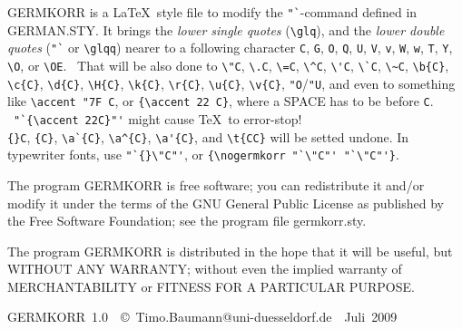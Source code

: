 \documentclass[12pt,a4paper]{article} \usepackage{german,germkorr}
\begin{document}
\vspace{0.7cm}\noindent\originalTeX GERMKORR is a \LaTeX\ style file to
modify the \verb|"`|-command defined in GERMAN.STY\@. It brings the {\it
lower single quotes\/} (\verb|\glq|), and the {\it lower double quotes\/}
(\verb|"`| or \verb|\glqq|) nearer to a following character \verb|C|,
\verb|G|, \verb|O|, \verb|Q|, \verb|U|, \verb|V|, \verb|v|, \verb|W|,
\verb|w|, \verb|T|, \verb|Y|, \verb|\O|, or \verb|\OE|. \ That will be also
done to \verb|\"C|, \verb|\.C|, \verb|\=C|, \verb|\^C|, \verb|\'C|,
\verb|\`C|, \verb|\~C|, \verb|\b{C}|, \verb|\c{C}|, \verb|\d{C}|,
\verb|\H{C}|, \verb|\k{C}|, \verb|\r{C}|, \verb|\u{C}|, \verb|\v{C}|,
\verb|"O|/\verb|"U|, and even to something like
\verb|\accent|~\verb|"7F|~\verb|C|, or \verb|{\accent|~\verb|22|~\verb|C}|,
where a SPACE has to be before \verb|C|. \ \verb|"`{\accent|~\verb|22C}"'|
might cause \TeX\ to error-stop!
\\ \verb|{}C|, \verb|{C}|, \verb|\a`{C}|, \verb|\a^{C}|, \verb|\a'{C}|, and
\verb|\t{CC}| will be setted undone. In typewriter fonts, use
\verb|"`{}\"C"'|, or \verb|{\nogermkorr|~\verb|"`\"C"'|~\verb|"`\"C"'}|.


\vfill {\footnotesize The program GERMKORR is free software; you can
redistribute it and/or modify it under the terms of the GNU General Public
License as published by the Free Software Foundation; see the program file
germkorr.sty.

The program GERMKORR is distributed in the hope that it will be useful, but 
WITHOUT ANY WARRANTY; without even the implied warranty of MERCHANTABILITY
or FITNESS FOR A PARTICULAR PURPOSE.}

\vfill \hfill 
\hbox{GERMKORR~1.0~~\copyright~Timo.Baumann@uni-duesseldorf.de~~Juli 2009}

% 
\end{document}
